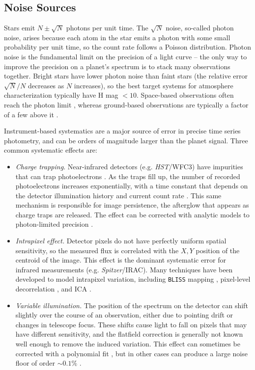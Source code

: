 \documentclass[graybox,natbib,nosecnum]{svmult}
\newcommand{\project}[1]{\textsl{#1}}
\newcommand{\HST}{\project{HST}}
\newcommand{\Spitzer}{\project{Spitzer}}
\begin{document}
\subsection{Noise Sources}
Stars emit $N \pm \sqrt{N}$ photons per unit time. The $\sqrt{N}$ noise, so-called photon noise, arises because each atom in the star emits a photon with some small probability per unit time, so the count rate follows a Poisson distribution. Photon noise is the fundamental limit on the precision of a light curve -- the only way to improve the precision on a planet's spectrum is to stack many observations together. Bright stars have lower photon noise than faint stars (the relative error $\sqrt{N}/N$ decreases as $N$ increases), so the best target systems for atmosphere characterization typically have H mag $< 10$.  Space-based observations often reach the photon limit \citep{sing11, deming13, ingalls16}, whereas ground-based observations are typically a factor of a few above it \citep[e.g.][]{bean13}. 

Instrument-based systematics are a major source of error in precise time series photometry, and can be orders of magnitude larger than the planet signal. Three common systematic effects are: 

\begin{itemize}
\item{\emph{Charge trapping}. Near-infrared detectors (e.g. \HST/WFC3) have impurities that can trap photoelectrons \citep{smith08}. As the traps fill up, the number of recorded photoelectrons increases exponentially, with a time constant that depends on the detector illumination history and current count rate \citep{zhou17}.  This same mechanism is responsible for image persistence, the afterglow that appears as charge traps are released. The effect can be corrected with analytic models to photon-limited precision \citep{deming13, line16}. 
}
\item{\emph{Intrapixel effect.} Detector pixels do not have perfectly uniform spatial sensitivity, so the measured flux is correlated with the $X, Y$ position of the centroid of the image. This effect is the dominant systematic error for infrared measurements (e.g. \Spitzer/IRAC). Many techniques have been developed to model intrapixel variation, including \texttt{BLISS} mapping \citep{stevenson12}, pixel-level decorrelation \citep{deming15}, and ICA \citep{morello15}.}
\item{\emph{Variable illumination.} The position of the spectrum on the detector can shift slightly over the course of an observation, either due to pointing drift or changes in telescope focus. These shifts cause light to fall on pixels that may have different sensitivity, and the flatfield correction is generally not known well enough to remove the induced variation. This effect can sometimes be corrected with a polynomial fit \citep[e.g. for HST/STIS observations;][]{sing11}, but in other cases can produce a large noise floor of order $\sim0.1\%$ \citep[as for the old HST instrument NICMOS;][]{gibson11}.}
\end{itemize}
\end{document}
